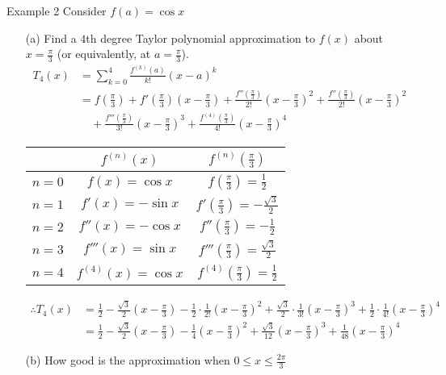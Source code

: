 \documentclass[12pt,a4paper]{article}
\begin{document}
\begin{eg}{Example 2}
	Consider $f(a)=\cos{x}$
	\begin{enumerate}
		\item[(a)] Find a $4$th degree Taylor polynomial approximation to $f(x)$ about $\displaystyle x=\frac{\pi}{3}$ (or equivalently, at $\displaystyle a=\frac{\pi}{3}$).\\
		$$\begin{aligned}
			T_4(x)&=\sum^4_{k=0}\frac{f^{(k)}(a)}{k!}(x-a)^k\\
			&=f\left(\frac{\pi}{3}\right)+f'\left(\frac{\pi}{3}\right)\left(x-\frac{\pi}{3}\right)+\frac{f''\left(\frac{\pi}{3}\right)}{2!}\left(x-\frac{\pi}{3}\right)^2+\frac{f''\left(\frac{\pi}{3}\right)}{2!}\left(x-\frac{\pi}{3}\right)^2\\
			&\quad+\frac{f'''\left(\frac{\pi}{3}\right)}{3!}\left(x-\frac{\pi}{3}\right)^3+\frac{f^{(4)}\left(\frac{\pi}{3}\right)}{4!}\left(x-\frac{\pi}{3}\right)^4
		\end{aligned}$$
		\begin{center}
			\begin{tabular}{c|c|c}
				&$f^{(n)}(x)$ & $f^{(n)}\left(\frac{\pi}{3}\right)$\\
				\hline
				$n=0$&$f(x)=\cos{x}$&$f\left(\frac{\pi}{3}\right)=\frac{1}{2}$\\
				$n=1$&$f'(x)=-\sin{x}$&$f'\left(\frac{\pi}{3}\right)=-\frac{\sqrt{3}}{2}$\\
				$n=2$&$f''(x)=-\cos{x}$&$f''\left(\frac{\pi}{3}\right)=-\frac{1}{2}$\\
				$n=3$&$f'''(x)=\sin{x}$&$f'''\left(\frac{\pi}{3}\right)=\frac{\sqrt{3}}{2}$\\
				$n=4$&$f^{(4)}(x)=\cos{x}$&$f^{(4)}\left(\frac{\pi}{3}\right)=\frac{1}{2}$
			\end{tabular}
		\end{center}
		$$\begin{aligned}
			\therefore T_4(x)&=\frac{1}{2}-\frac{\sqrt{3}}{2}\left(x-\frac{\pi}{3}\right)-\frac{1}{2}\cdot\frac{1}{2!}\left(x-\frac{\pi}{3}\right)^2+\frac{\sqrt{3}}{2}\cdot\frac{1}{3!}\left(x-\frac{\pi}{3}\right)^3+\frac{1}{2}\cdot\frac{1}{4!}\left(x-\frac{\pi}{3}\right)^4\\
			&\boxed{=\frac{1}{2}-\frac{\sqrt{3}}{2}\left(x-\frac{\pi}{3}\right)-\frac{1}{4}\left(x-\frac{\pi}{3}\right)^2+\frac{\sqrt{3}}{12}\left(x-\frac{\pi}{3}\right)^3+\frac{1}{48}\left(x-\frac{\pi}{3}\right)^4}
		\end{aligned}$$
		\item[(b)] How good is the approximation when $\displaystyle 0\leq x\leq\frac{2\pi}{3}$\\

\end{enumerate}
\end{eg}
\end{document}

